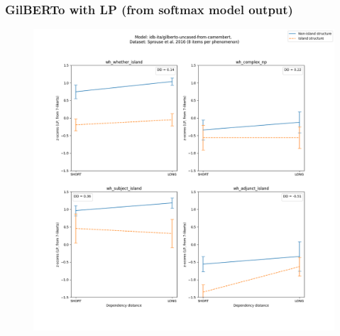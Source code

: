 \subsubsection{GilBERTo with LP (from softmax model output)}
\begin{figure}[h]
	\centering
	\includegraphics[width=1\textwidth]{images/Chapter1/Sprouse_wh_idb-ita_gilberto-uncased-from-camembert_LP-zscores-likert-2022-07-11.png} 
\end{figure}

\clearpage
